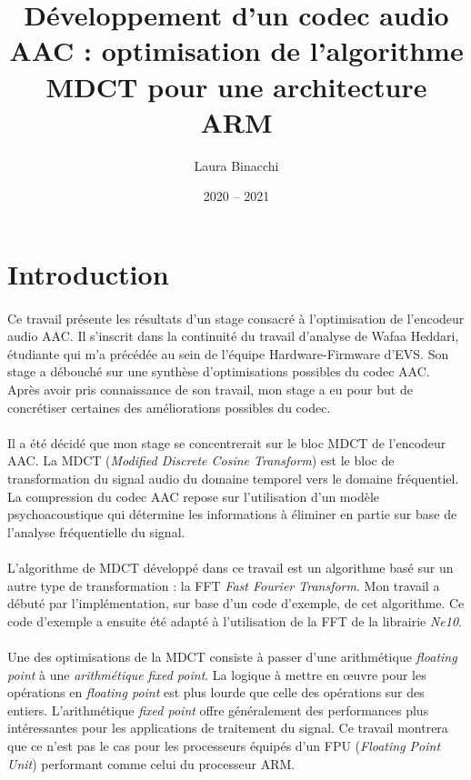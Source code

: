 \documentclass{article}
\title{Développement d'un codec audio AAC : optimisation de l'algorithme MDCT pour une architecture ARM}
\date{2020 -- 2021}
\author{Laura Binacchi}
\begin{document}
    
    \newpage
    

    \newpage
    \tableofcontents
    \newpage
    \listoffigures
    \newpage
    \printglossary[toctitle=\protect\numberline{}Glossaire]


    \newpage
    \section*{Introduction}

    \paragraph{}
    Ce travail présente les résultats d'un stage consacré à l'optimisation de l'encodeur audio AAC. Il s'inscrit dans la continuité du travail d'analyse de Wafaa Heddari, étudiante qui m'a précédée au sein de l'équipe Hardware-Firmware d'EVS. Son stage a débouché sur une synthèse d'optimisations possibles du codec AAC. Après avoir pris connaissance de son travail, mon stage a eu pour but de concrétiser certaines des améliorations possibles du codec.

    \paragraph{}
    Il a été décidé que mon stage se concentrerait sur le bloc MDCT de l'encodeur AAC. La MDCT (\emph{Modified Discrete Cosine Transform}) est le bloc de transformation du signal audio du domaine temporel vers le domaine fréquentiel. La compression du codec AAC repose sur l'utilisation d'un modèle psychoacoustique qui détermine les informations à éliminer en partie sur base de l'analyse fréquentielle du signal.

    \paragraph{}
    L'algorithme de MDCT développé dans ce travail est un algorithme basé sur un autre type de transformation : la FFT \emph{Fast Fourier Transform}. Mon travail a débuté par l'implémentation, sur base d'un code d'exemple, de cet algorithme. Ce code d'exemple a ensuite été adapté à l'utilisation de la FFT de la librairie \emph{Ne10}.

    \paragraph{}
    Une des optimisations de la MDCT consiste à passer d'une arithmétique \emph{floating point} à une \emph{arithmétique fixed point}. La logique à mettre en \oe uvre pour les opérations en \emph{floating point} est plus lourde que celle des opérations sur des entiers. L'arithmétique \emph{fixed point} offre généralement des performances plus intéressantes pour les applications de traitement du signal. Ce travail montrera que ce n'est pas le cas pour les processeurs équipés d'un FPU (\emph{Floating Point Unit}) performant comme celui du processeur ARM.
\end{document}
